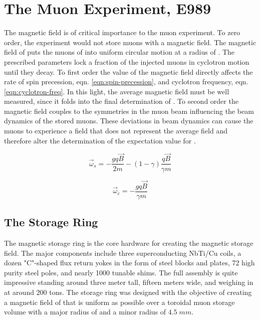 \chapter {The Muon \gmtwo Experiment, E989}

The magnetic field is of critical importance to the muon \gmtwo experiment. To zero order, the experiment would not store muons with a magnetic field.  The magnetic field of \bmagic puts the muons of \rmagic into uniform circular motion at a radius of \pmagic.  The prescribed parameters lock a fraction of the injected muons in cyclotron motion until they decay.  To first order the value of the magnetic field directly affects the rate of spin precession, eqn. \ref{eqn:spin-precession}, and cyclotron frequency, eqn. \ref{eqn:cyclotron-freq}.  In this light, the average magnetic field must be well measured, since it folds into the final determination of \wa.  To second order the magnetic field couples to the symmetries in the muon beam influencing the beam dynamics of the stored muons.  These deviations in beam dynamics can cause the muons to experience a field that does not represent the average field and therefore alter the determination of the expectation value for \wa.

\begin{equation}
\vec{\omega}_s = -\frac{gq\vec{B}}{2m} - (1 - \gamma) \frac{q\vec{B}}{\gamma m}
\label{eqn:spin-precession}
\end{equation}

\begin{equation}
\vec{\omega}_c = -\frac{gq\vec{B}}{\gamma m}
\label{eqn:cyclotron-freq}
\end{equation}

\section{The Storage Ring}

The magnetic storage ring is the core hardware for creating the magnetic storage field.  The major components include three superconducting NbTi/Cu coils, a dozen "C"-shaped flux return yokes in the form of steel blocks and plates, 72 high purity steel poles, and nearly 1000 tunable shims.  The full assembly is quite impressive standing around three meter tall, fifteen meters wide, and weighing in at around 200 tons.  The storage ring was designed with the objective of creating a magnetic field of \bmagic that is uniform as possible over a toroidal muon storage volume with a major radius of \rmagic and a minor radius of $4.5\;mm$.

